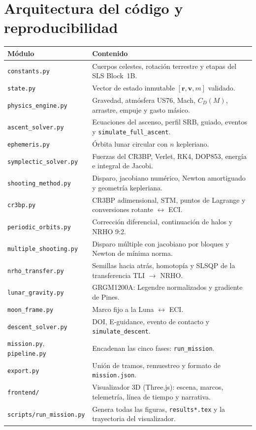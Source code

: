 \documentclass[11pt,a4paper]{article}
\newcommand{\vect}[1]{\mathbf{#1}}
\begin{document}
\appendix
\section{Arquitectura del código y reproducibilidad}
\begin{tabularx}{\textwidth}{@{}lX@{}}
\toprule
\textbf{Módulo} & \textbf{Contenido} \\
\midrule
\texttt{constants.py} & Cuerpos celestes, rotación terrestre y etapas del SLS Block~1B. \\
\texttt{state.py} & Vector de estado inmutable $[\vect r,\vect v,m]$ validado. \\
\texttt{physics\_engine.py} & Gravedad, atmósfera US76, Mach, $C_D(M)$, arrastre, empuje y gasto másico. \\
\texttt{ascent\_solver.py} & Ecuaciones del ascenso, perfil SRB, guiado, eventos y \texttt{simulate\_full\_ascent}. \\
\texttt{ephemeris.py} & Órbita lunar circular con $n$ kepleriano. \\
\texttt{symplectic\_solver.py} & Fuerzas del CR3BP, Verlet, RK4, DOP853, energía e integral de Jacobi. \\
\texttt{shooting\_method.py} & Disparo, jacobiano numérico, Newton amortiguado y geometría kepleriana. \\
\texttt{cr3bp.py} & CR3BP adimensional, STM, puntos de Lagrange y conversiones rotante $\leftrightarrow$ ECI. \\
\texttt{periodic\_orbits.py} & Corrección diferencial, continuación de halos y NRHO 9:2. \\
\texttt{multiple\_shooting.py} & Disparo múltiple con jacobiano por bloques y Newton de mínima norma. \\
\texttt{nrho\_transfer.py} & Semillas hacia atrás, homotopía y SLSQP de la transferencia TLI $\rightarrow$ NRHO. \\
\texttt{lunar\_gravity.py} & GRGM1200A: Legendre normalizados y gradiente de Pines. \\
\texttt{moon\_frame.py} & Marco fijo a la Luna $\leftrightarrow$ ECI. \\
\texttt{descent\_solver.py} & DOI, E-guidance, evento de contacto y \texttt{simulate\_descent}. \\
\texttt{mission.py}, \texttt{pipeline.py} & Encadenan las cinco fases: \texttt{run\_mission}. \\
\texttt{export.py} & Unión de tramos, remuestreo y formato de \texttt{mission.json}. \\
\texttt{frontend/} & Visualizador 3D (Three.js): escena, marcos, telemetría, línea de tiempo y narrativa. \\
\texttt{scripts/run\_mission.py} & Genera todas las figuras, \texttt{results*.tex} y la trayectoria del visualizador. \\
\bottomrule
\end{tabularx}
\end{document}
